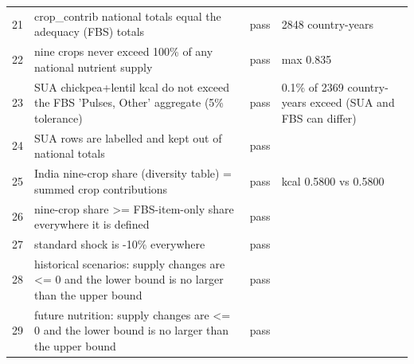 {\begin{longtable}{rL{0.569}cL{0.261}}
21 & crop\_contrib national totals equal the adequacy (FBS) totals & pass & 2848 country-years \\
22 & nine crops never exceed 100\% of any national nutrient supply & pass & max 0.835 \\
23 & SUA chickpea+lentil kcal do not exceed the FBS 'Pulses, Other' aggregate (5\% tolerance) & pass & 0.1\% of 2369 country-years exceed (SUA and FBS can differ) \\
24 & SUA rows are labelled and kept out of national totals & pass &  \\
25 & India nine-crop share (diversity table) = summed crop contributions & pass & kcal 0.5800 vs 0.5800 \\
26 & nine-crop share >= FBS-item-only share everywhere it is defined & pass &  \\
27 & standard shock is -10\% everywhere & pass &  \\
28 & historical scenarios: supply changes are <= 0 and the lower bound is no larger than the upper bound & pass &  \\
29 & future nutrition: supply changes are <= 0 and the lower bound is no larger than the upper bound & pass &  \\
\end{longtable}}
